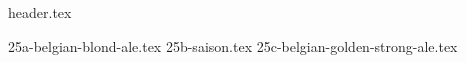 \clearpage
{}
\divisorLine
{header.tex}
\begin{multicols}{2}
{25a-belgian-blond-ale.tex}
{25b-saison.tex}
{25c-belgian-golden-strong-ale.tex}
\end{multicols}